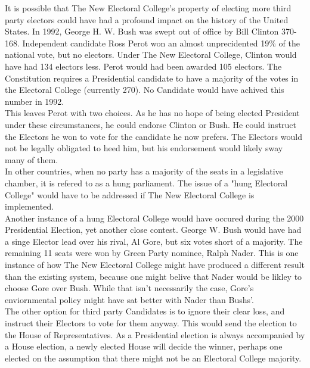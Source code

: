 \documentclass{article}
\begin{document}
    It is possible that The New Electoral College's property of electing more third party electors could have had a profound impact on the history of the United States. In 1992, George H. W. Bush was swept out of office by Bill Clinton 370-168. Independent candidate Ross Perot won an almost unprecidented 19\% of the national vote, but no electors. Under The New Electoral College, Clinton would have had 134 electors less. Perot would had been awarded 105 electors. The Constitution requires a Presidential candidate to have a majority of the votes in the Electoral College (currently 270). No Candidate would have achived this number in 1992.\\
    
    This leaves Perot with two choices. As he has no hope of being elected President under these circumstances, he could endorse Clinton or Bush. He could instruct the Electors he won to vote for the candidate he now prefers. The Electors would not be legally obligated to heed him, but his endorsement would likely sway many of them.\\
    
    In other countries, when no party has a majority of the seats in a legislative chamber, it is refered to as a hung parliament. The issue of a "hung Electoral College" would have to be addressed if The New Electoral College is implemented.\\
    
    Another instance of a hung Electoral College would have occured during the 2000 Presidential Election, yet another close contest. George W. Bush would have had a singe Elector lead over his rival, Al Gore, but six votes short of a majority. The remaining 11 seats were won by Green Party nominee, Ralph Nader. This is one instance of how The New Electoral College might have produced a different result than the existing system, because one might belive that Nader would be likley to choose Gore over Bush. While that isn't necessarily the case, Gore's enviornmental policy might have sat better with Nader than Bushs'.\\

    The other option for third party Candidates is to ignore their clear loss, and instruct their Electors to vote for them anyway. This would send the election to the House of Representatives. As a Presidential election is always accompanied by a House election, a newly elected House will decide the winner, perhaps one elected on the assumption that there might not be an Electoral College majority.\\
\end{document}
